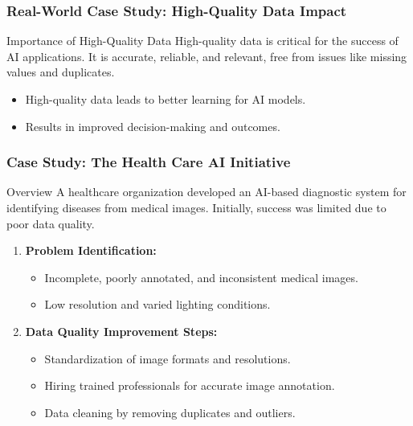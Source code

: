 \documentclass[aspectratio=169]{beamer}
\begin{document}
\begin{frame}[fragile]
    \frametitle{Real-World Case Study: High-Quality Data Impact}
    \begin{block}{Importance of High-Quality Data}
        High-quality data is critical for the success of AI applications. It is accurate, reliable, and relevant, free from issues like missing values and duplicates. 
        \begin{itemize}
            \item High-quality data leads to better learning for AI models.
            \item Results in improved decision-making and outcomes.
        \end{itemize}
    \end{block}
\end{frame}

\begin{frame}[fragile]
    \frametitle{Case Study: The Health Care AI Initiative}
    \begin{block}{Overview}
        A healthcare organization developed an AI-based diagnostic system for identifying diseases from medical images. Initially, success was limited due to poor data quality.
    \end{block}

    \begin{enumerate}
        \item \textbf{Problem Identification:}
        \begin{itemize}
            \item Incomplete, poorly annotated, and inconsistent medical images.
            \item Low resolution and varied lighting conditions.
        \end{itemize}

        \item \textbf{Data Quality Improvement Steps:}
        \begin{itemize}
            \item Standardization of image formats and resolutions.
            \item Hiring trained professionals for accurate image annotation.
            \item Data cleaning by removing duplicates and outliers.
        \end{itemize}
    \end{enumerate}
\end{frame}
\end{document}
